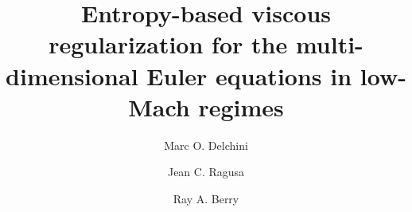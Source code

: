 \documentclass[preprint,10pt]{elsarticle}
\begin{document}
\begin{frontmatter}


\title{Entropy-based viscous regularization for the multi-dimensional Euler equations in low-Mach regimes}
\author{Marc O. Delchini}

\author{Jean C. Ragusa}

\author{Ray A. Berry}

\address[label1]{Department of Nuclear Engineering, Texas A\&M University, College Station, TX 77843, USA }

\address[label2]{Idaho National Laboratory, Idaho Falls, ID 83415, USA }


\end{frontmatter}
\end{document}

